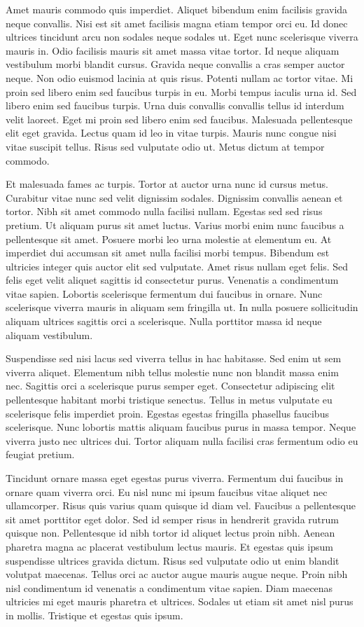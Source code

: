 \documentclass[12pt]{article}
\begin{document}
Amet mauris commodo quis imperdiet. Aliquet bibendum enim facilisis gravida neque convallis. Nisi est sit amet facilisis magna etiam tempor orci eu. Id donec ultrices tincidunt arcu non sodales neque sodales ut. Eget nunc scelerisque viverra mauris in. Odio facilisis mauris sit amet massa vitae tortor. Id neque aliquam vestibulum morbi blandit cursus. Gravida neque convallis a cras semper auctor neque. Non odio euismod lacinia at quis risus. Potenti nullam ac tortor vitae. Mi proin sed libero enim sed faucibus turpis in eu. Morbi tempus iaculis urna id. Sed libero enim sed faucibus turpis. Urna duis convallis convallis tellus id interdum velit laoreet. Eget mi proin sed libero enim sed faucibus. Malesuada pellentesque elit eget gravida. Lectus quam id leo in vitae turpis. Mauris nunc congue nisi vitae suscipit tellus. Risus sed vulputate odio ut. Metus dictum at tempor commodo.

Et malesuada fames ac turpis. Tortor at auctor urna nunc id cursus metus. Curabitur vitae nunc sed velit dignissim sodales. Dignissim convallis aenean et tortor. Nibh sit amet commodo nulla facilisi nullam. Egestas sed sed risus pretium. Ut aliquam purus sit amet luctus. Varius morbi enim nunc faucibus a pellentesque sit amet. Posuere morbi leo urna molestie at elementum eu. At imperdiet dui accumsan sit amet nulla facilisi morbi tempus. Bibendum est ultricies integer quis auctor elit sed vulputate. Amet risus nullam eget felis. Sed felis eget velit aliquet sagittis id consectetur purus. Venenatis a condimentum vitae sapien. Lobortis scelerisque fermentum dui faucibus in ornare. Nunc scelerisque viverra mauris in aliquam sem fringilla ut. In nulla posuere sollicitudin aliquam ultrices sagittis orci a scelerisque. Nulla porttitor massa id neque aliquam vestibulum.

Suspendisse sed nisi lacus sed viverra tellus in hac habitasse. Sed enim ut sem viverra aliquet. Elementum nibh tellus molestie nunc non blandit massa enim nec. Sagittis orci a scelerisque purus semper eget. Consectetur adipiscing elit pellentesque habitant morbi tristique senectus. Tellus in metus vulputate eu scelerisque felis imperdiet proin. Egestas egestas fringilla phasellus faucibus scelerisque. Nunc lobortis mattis aliquam faucibus purus in massa tempor. Neque viverra justo nec ultrices dui. Tortor aliquam nulla facilisi cras fermentum odio eu feugiat pretium.

Tincidunt ornare massa eget egestas purus viverra. Fermentum dui faucibus in ornare quam viverra orci. Eu nisl nunc mi ipsum faucibus vitae aliquet nec ullamcorper. Risus quis varius quam quisque id diam vel. Faucibus a pellentesque sit amet porttitor eget dolor. Sed id semper risus in hendrerit gravida rutrum quisque non. Pellentesque id nibh tortor id aliquet lectus proin nibh. Aenean pharetra magna ac placerat vestibulum lectus mauris. Et egestas quis ipsum suspendisse ultrices gravida dictum. Risus sed vulputate odio ut enim blandit volutpat maecenas. Tellus orci ac auctor augue mauris augue neque. Proin nibh nisl condimentum id venenatis a condimentum vitae sapien. Diam maecenas ultricies mi eget mauris pharetra et ultrices. Sodales ut etiam sit amet nisl purus in mollis. Tristique et egestas quis ipsum.
\end{document}
